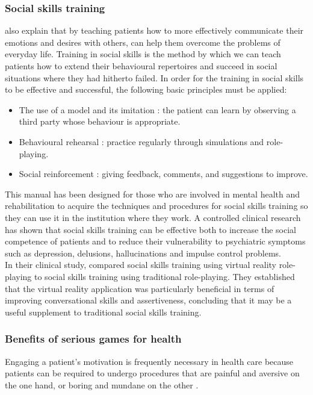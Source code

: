 \documentclass[11pt]{article}
\begin{document}
\subsubsection{Social skills training}
\citeauthor{Liberman05} also explain that by teaching patients how to more effectively communicate their emotions and desires with others, can help them overcome the problems of everyday life. Training in social skills is the method by which we can teach patients how to extend their behavioural repertoires and succeed in social situations where they had hitherto failed.
In order for the training in social skills to be effective and successful, the following basic principles must be applied:
\begin{itemize}
\item The use of a model and its imitation : the patient can learn by observing a third party whose behaviour is appropriate.
\item Behavioural rehearsal : practice regularly through simulations and role-playing.
\item Social reinforcement : giving feedback, comments, and suggestions to improve.
\end{itemize} 
This manual \citep{Liberman05} has been designed for those who are involved in mental health and rehabilitation to acquire the techniques and procedures for social skills training so they can use it in the institution where they work. A controlled clinical research has shown that social skills training can be effective both to increase the social competence of patients and to reduce their vulnerability to psychiatric symptoms such as depression, delusions, hallucinations and impulse control problems.\\

In their clinical study, \citeauthor{Park11} compared social skills training using virtual reality role-playing to social skills training using traditional role-playing. They established that the virtual reality application was particularly beneficial in terms of improving conversational skills and assertiveness, concluding that it may be a useful supplement to traditional social skills training. 
\subsubsection{Benefits of serious games for health}
Engaging a patient's motivation is frequently necessary in health care because patients can be required to undergo procedures that are painful and aversive on the one hand, or boring and mundane on the other \citep{Kato12}.\\
\end{document}
